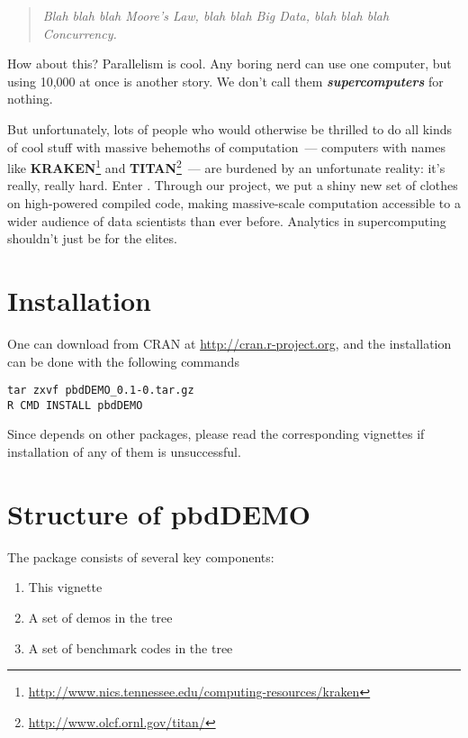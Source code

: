 \begin{quote}
\emph{
Blah blah blah Moore's Law, blah blah Big Data, blah blah blah Concurrency.
}
\end{quote}

How about this? Parallelism is cool. Any boring nerd can use one computer,
but using 10,000 at once is another story. We don't call them
\emph{\textbf{supercomputers}} for nothing.

But unfortunately, lots of people who would otherwise be thrilled to do all
kinds of cool stuff with massive behemoths of computation~--- computers with
names like \textbf{KRAKEN}\footnote{
\url{http://www.nics.tennessee.edu/computing-resources/kraken}
} and \textbf{TITAN}\footnote{
\url{http://www.olcf.ornl.gov/titan/}
}~--- are burdened by an
unfortunate reality:  it's really, really hard.
Enter . Through our project, we put a shiny new set of
clothes on high-powered compiled code, making massive-scale computation
accessible to a wider audience of data scientists than ever before.
Analytics in supercomputing shouldn't just be for the elites.



\section[Installation]{Installation}
\label{sec:installation}

One can download  from CRAN at
\url{http://cran.r-project.org}, and
the installation can be done with the following commands
\begin{lstlisting}
tar zxvf pbdDEMO_0.1-0.tar.gz
R CMD INSTALL pbdDEMO
\end{lstlisting}
Since  depends on other  packages, please read
the corresponding vignettes if installation of any of them is unsuccessful.





\section{Structure of pbdDEMO}

The  package consists of several key components:

\begin{enumerate}
  \item This vignette
  \item A set of demos in the  tree
  \item A set of benchmark codes in the  tree
\end{enumerate}

